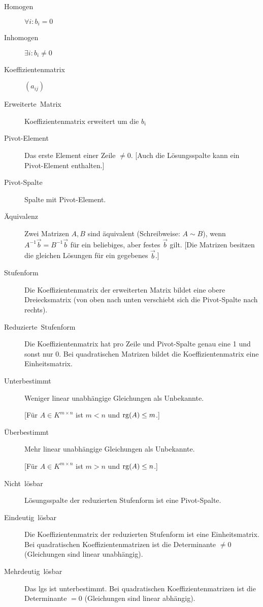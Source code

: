 \begin{description}
  \item [{Homogen}] 
	$\forall i:b_i=0$
  \item [{Inhomogen}] 
	$\exists i:b_i\neq0$
  \item [{Koeffizientenmatrix}] 
	$(a_{ij})$
  \item [{Erweiterte~Matrix}] 
	Koeffizientenmatrix erweitert um die $b_i$
  \item [{Pivot-Element}] 
	Das erste Element einer Zeile $\neq0$.
	[Auch die Lösungsspalte kann ein Pivot-Element enthalten.]
  \item [{Pivot-Spalte}] 
	Spalte mit Pivot-Element.
  \item [{Äquivalenz}] 
	Zwei Matrizen $A,B$ sind äquivalent (Schreibweise: $A\sim B$), wenn $A^{-1}\vec b = B^{-1}\vec b$ für ein beliebiges, aber festes $\vec b$ gilt.
	[Die Matrizen besitzen die gleichen Lösungen für ein gegebenes $\vec b$.]
  \item [{Stufenform}] 
	Die Koeffizientenmatrix der erweiterten Matrix bildet eine obere Dreiecksmatrix (von oben nach unten verschiebt sich die Pivot-Spalte nach rechts).
  \item [{Reduzierte~Stufenform}] 
	Die Koeffizientenmatrix hat pro Zeile und Pi\-vot-Spal\-te genau eine 1 und sonst nur 0.
	Bei quadratischen Matrizen bildet die Koeffizientenmatrix eine Einheitsmatrix.
  \item [{Unterbestimmt}] 
	Weniger linear unabhängige Gleichungen als Unbekannte.
    
	[Für $A \in K^{m\times n}$ ist $m<n$ und $\operatorname{rg}(A) \leq m$.]
  \item [{Überbestimmt}] 
	Mehr linear unabhängige Gleichungen als Unbekannte.
    
	[Für $A \in K^{m\times n}$ ist $m>n$ und $\operatorname{rg}(A) \leq n$.]
  \item [{Nicht~lösbar}]
	Lösungsspalte der reduzierten Stufenform ist eine Pivot-Spalte.
  \item [{Eindeutig~lösbar}]
	Die Koeffizientenmatrix der reduzierten Stufenform ist eine Einheitsmatrix. Bei quadratischen
	Koeffizientenmatrizen ist die Determinante $\neq0$ (Gleichungen sind linear unabhängig).
  \item [{Mehrdeutig~lösbar}]
	Das \gls{lgs} ist unterbestimmt. Bei quadratischen Koeffizientenmatrizen ist die Determinante $=0$ (Gleichungen sind linear abhängig).
\end{description}

